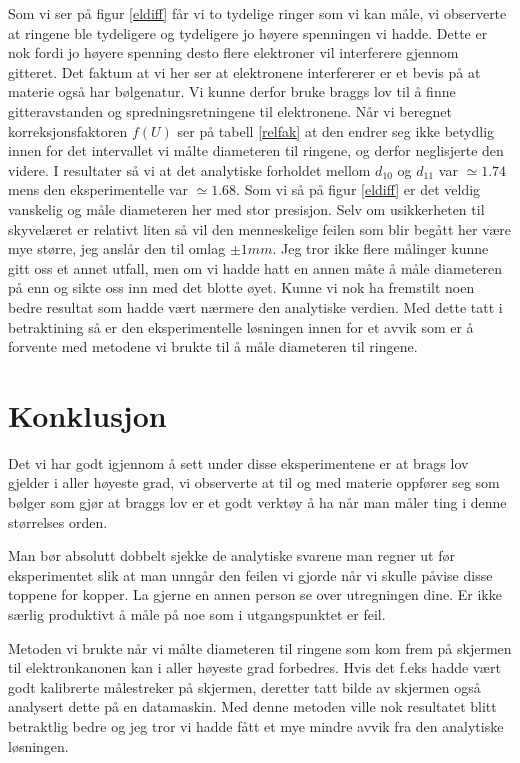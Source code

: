 \documentclass[norsk,a4paper,12pt]{article}
\begin{document}
Som vi ser på figur \vref{eldiff} får vi to tydelige ringer som vi kan måle, vi observerte at ringene ble tydeligere og tydeligere jo høyere spenningen vi hadde. Dette er nok fordi jo høyere spenning desto flere elektroner vil interferere gjennom gitteret. Det faktum at vi her ser at elektronene interfererer er et bevis på at materie også har bølgenatur. Vi kunne derfor bruke braggs lov til å finne gitteravstanden og spredningsretningene til elektronene. Når vi beregnet korreksjonsfaktoren $f(U)$ ser på tabell \vref{relfak} at den endrer seg ikke betydlig innen for det intervallet vi målte diameteren til ringene, og derfor neglisjerte den videre. I resultater så vi at det analytiske forholdet mellom $d_{10}$ og $d_{11}$ var $\simeq 1.74$ mens den eksperimentelle var $\simeq 1.68$. Som vi så på figur \ref{eldiff} er det veldig vanskelig og måle diameteren her med stor presisjon. Selv om usikkerheten til skyvelæret er relativt liten så vil den menneskelige feilen som blir begått her være mye større, jeg anslår den til omlag $\pm 1 mm$. Jeg tror ikke flere målinger kunne gitt oss et annet utfall, men om vi hadde hatt en annen måte å måle diameteren på enn og sikte oss inn med det blotte øyet. Kunne vi nok ha fremstilt noen bedre resultat som hadde vært nærmere den analytiske verdien. Med dette tatt i betraktining så er den eksperimentelle løsningen innen for et avvik som er å forvente med metodene vi brukte til å måle diameteren til ringene.

\section{Konklusjon}

Det vi har godt igjennom å sett under disse eksperimentene er at brags lov gjelder i aller høyeste grad, vi observerte at til og med materie oppfører seg som bølger som gjør at braggs lov er et godt verktøy å ha når man måler ting i denne størrelses orden. 

Man bør absolutt dobbelt sjekke de analytiske svarene man regner ut før eksperimentet slik at man unngår den feilen vi gjorde når vi skulle påvise disse toppene for kopper. La gjerne en annen person se over utregningen dine. Er ikke særlig produktivt å måle på noe som i utgangspunktet er feil. 

Metoden vi brukte når vi målte diameteren til ringene som kom frem på skjermen til elektronkanonen kan i aller høyeste grad forbedres. Hvis det f.eks hadde vært godt kalibrerte målestreker på skjermen, deretter tatt bilde av skjermen også analysert dette på en datamaskin. Med denne metoden ville nok resultatet blitt betraktlig bedre og jeg tror vi hadde fått et mye mindre avvik fra den analytiske løsningen. 
\end{document}
